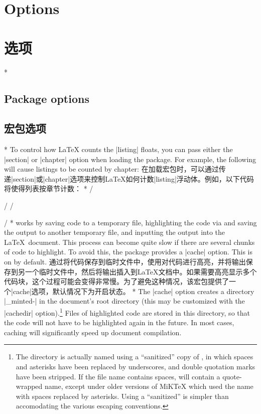 \begin{paracol}{2}
\section{Options}
\switchcolumn
\section{选项}
\switchcolumn[0]*%
\subsection{Package options}
\switchcolumn
\subsection{宏包选项}
\switchcolumn[0]*%
To control how \LaTeX{} counts the |listing| floats, you can pass either the
|section| or |chapter| option when loading the  package.
For example, the following will cause listings to be counted by chapter:
\switchcolumn
{}
在加载宏包时，可以通过传递|section|或|chapter|选项来控制\LaTeX{}如何计数|listing|浮动体。例如，以下代码将使得列表按章节计数：
\switchcolumn[0]*%
/\usepackage[chapter]{minted}/
\switchcolumn
{}/\usepackage[chapter]{minted}/
\switchcolumn[0]*%
 works by saving code to a temporary file, highlighting the code via  and saving the output to another temporary file, and inputting the output into the \LaTeX\ document.  This process can become quite slow if there are several chunks of code to highlight.  To avoid this, the package provides a |cache| option.  This is on by default.
\switchcolumn
{}
通过将代码保存到临时文件中，使用对代码进行高亮，并将输出保存到另一个临时文件中，然后将输出插入到\LaTeX{}文档中。如果需要高亮显示多个代码块，这个过程可能会变得非常慢。为了避免这种情况，该宏包提供了一个|cache|选项，默认情况下为开启状态。
\switchcolumn[0]*%
The |cache| option creates a directory |_minted-| in the document's root directory (this may be customized with the |cachedir| option).\footnote{The directory is actually named using a ``sanitized'' copy of , in which spaces and asterisks have been replaced by underscores, and double quotation marks have been stripped.  If the file name contains spaces, \texttt{\string\jobname} will contain a quote-wrapped name, except under older versions of MiKTeX which used the name with spaces replaced by asterisks.  Using a ``sanitized''  is simpler than accomodating the various escaping conventions.}  Files of highlighted code are stored in this directory, so that the code will not have to be highlighted again in the future.  In most cases, caching will significantly speed up document compilation.

\end{paracol}
